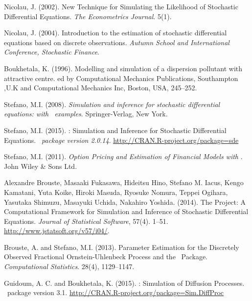 \begin{thebibliography}{1}
Nicolau, J. (2002).
\newblock New Technique for Simulating the Likelihood of Stochastic Differential Equations.
\newblock \emph{The Econometrics Journal}. 5(1).

Nicolau, J. (2004).
\newblock  Introduction to the estimation of stochastic differential equations based on discrete observations.
\newblock  \emph{Autumn School and International Conference, Stochastic Finance}.

Boukhetala, K. (1996).
\newblock Modelling and simulation of a dispersion pollutant with attractive centre.
\newblock ed by Computational Mechanics Publications, Southampton ,U.K and Computational Mechanics Inc, Boston, USA, 245--252.

Stefano, M.I. (2008).
\newblock \emph{Simulation and inference for stochastic differential equations: with \R~examples}.
\newblock Springer-Verlag, New York.

Stefano, M.I. (2015).
\newblock {}: Simulation and Inference for Stochastic Differential Equations.
\newblock \emph{\R~package version 2.0.14}.
\newblock \url{http://CRAN.R-project.org/package=sde}

Stefano, M.I. (2011).
\newblock \emph{Option Pricing and Estimation of Financial Models with \R}.
\newblock John Wiley \& Sons Ltd.

Alexandre Brouste, Masaaki Fukasawa, Hideitsu Hino, Stefano M. Iacus, Kengo Kamatani, Yuta Koike, Hiroki Masuda, Ryosuke Nomura, Teppei Ogihara, Yasutaka Shimuzu, Masayuki Uchida, Nakahiro Yoshida. (2014).
\newblock The  Project: A Computational Framework for Simulation and Inference of Stochastic Differential Equations.
\newblock \emph{Journal of Statistical Software}, 57(4). 1--51.
\newblock \url{http://www.jstatsoft.org/v57/i04/}.

Brouste, A. and Stefano, M.I. (2013).
\newblock Parameter Estimation for the Discretely Observed Fractional Ornstein-Uhlenbeck Process and the  \R~Package.
\newblock \emph{Computational Statistics}. 28(4), 1129--1147.

Guidoum, A. C. and Boukhetala, K. (2015).
\newblock {}: Simulation of Diffusion Processes.
\newblock \R~package version 3.1.
\newblock \url{http://CRAN.R-project.org/package=Sim.DiffProc}


\end{thebibliography}
